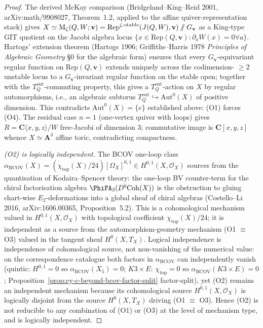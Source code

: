 \begin{proof}
The derived McKay comparison (Bridgeland--King--Reid 2001,
arXiv:math/9908027, Theorem~1.2, applied to the affine
quiver-representation stack) gives
$X \simeq \mathrm{M}_\zeta(Q, W; \mathbf v) =
\mathrm{Rep}^{\zeta\text{-stable}}(J(Q, W), \mathbf v) \mathbin{/\mkern-6mu/}
G_\mathbf v$ as a King-type GIT quotient on the Jacobi algebra locus
$\{x \in \mathrm{Rep}(Q, \mathbf v) : \partial_a W(x) = 0 \forall a\}$.
Hartogs' extension theorem (Hartogs 1906; Griffiths--Harris 1978
\emph{Principles of Algebraic Geometry} \S 0 for the algebraic form)
ensures that every $G_\mathbf v$-equivariant regular function on
$\mathrm{Rep}(Q, \mathbf v)$ extends uniquely across the codimension-%
$\geq 2$ unstable locus to a $G_\mathbf v$-invariant regular function
on the stable open; together with the $T_Q^{\mathrm{out}}$-commuting
property, this gives a $T_Q^{\mathrm{out}}$-action on $X$ by regular
automorphisms, i.e., an algebraic subtorus
$T_Q^{\mathrm{out}} \hookrightarrow \mathrm{Aut}^0(X)$ of positive
dimension. This contradicts $\mathrm{Aut}^0(X) = \{e\}$ established
above: (O1) forces (O4). The residual case $n = 1$ (one-vertex
quiver with loops) gives $R = \mathbf C\langle x, y, z\rangle / W$
free-Jacobi of dimension $3$; commutative image is $\mathbf C[x,y,z]$
whence $X \simeq \mathbf A^3$ affine toric, contradicting compactness.

\emph{(O2) is logically independent.} The BCOV one-loop class
$\alpha_{\mathrm{BCOV}}(X) = (\chi_{\mathrm{top}}(X)/24)[\Omega_X]^{0,1}
\in H^{0,1}(X, \mathcal O_X)$ sources from the quantisation of
Kodaira--Spencer theory: the one-loop BV counter-term for the chiral
factorisation algebra $\PhiFA_3(D^b\Coh(X))$ is the obstruction to
gluing chart-wise $E_2$-deformations into a global sheaf of chiral
algebras (Costello--Li 2016, arXiv:1606.00365, Proposition~5.2). This
is a cohomological mechanism valued in $H^{0,1}(X, \mathcal O_X)$ with
topological coefficient $\chi_{\mathrm{top}}(X)/24$; it is independent
as a source from the automorphism-geometry mechanism (O1 $\equiv$ O3)
valued in the tangent sheaf $H^0(X, T_X)$. Logical independence is
independence of cohomological source, not non-vanishing of the
numerical value: on the correspondence catalogue both factors in
$\alpha_{\mathrm{BCOV}}$ can independently vanish (quintic:
$H^{0,1} = 0$ so $\alpha_{\mathrm{BCOV}}(X_5) = 0$; $K3 \times E$:
$\chi_{\mathrm{top}} = 0$ so $\alpha_{\mathrm{BCOV}}(K3 \times E) = 0$;
Proposition~\ref{prop:cy-c-beyond-bcov-factor-split} factor-split),
yet (O2) remains an independent mechanism because its cohomological
source $H^{0,1}(X, \mathcal O_X)$ is logically disjoint from the
source $H^0(X, T_X)$ driving (O1 $\equiv$ O3). Hence (O2) is not
reducible to any combination of (O1) or (O3) at the level of
mechanism type, and is logically independent.


\end{proof}
